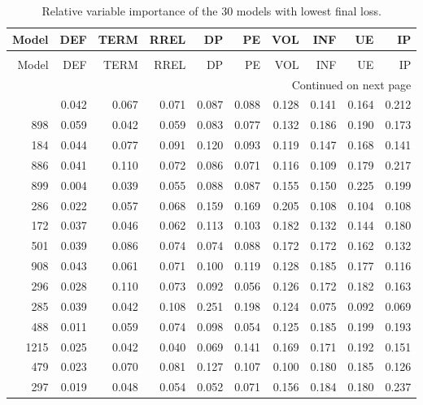 \begin{longtable}{rrrrrrrrrr}
\caption{Relative variable importance of the 30 models with lowest final loss.}
\label{tab:Importance_loss_FP_30}\\
\toprule
 Model &    DEF &  TERM &  RREL &    DP &    PE &   VOL &   INF &    UE &    IP \\
\midrule
\endfirsthead
\caption[]{Relative variable importance of the 30 models with lowest final loss.} \\
\toprule
 Model &    DEF &  TERM &  RREL &    DP &    PE &   VOL &   INF &    UE &    IP \\
\midrule
\endhead
\midrule
\multicolumn{10}{r}{{Continued on next page}} \\
\midrule
\endfoot

\bottomrule
\endlastfoot
   491 &  0.042 & 0.067 & 0.071 & 0.087 & 0.088 & 0.128 & 0.141 & 0.164 & 0.212 \\
   898 &  0.059 & 0.042 & 0.059 & 0.083 & 0.077 & 0.132 & 0.186 & 0.190 & 0.173 \\
   184 &  0.044 & 0.077 & 0.091 & 0.120 & 0.093 & 0.119 & 0.147 & 0.168 & 0.141 \\
   886 &  0.041 & 0.110 & 0.072 & 0.086 & 0.071 & 0.116 & 0.109 & 0.179 & 0.217 \\
   899 &  0.004 & 0.039 & 0.055 & 0.088 & 0.087 & 0.155 & 0.150 & 0.225 & 0.199 \\
   286 &  0.022 & 0.057 & 0.068 & 0.159 & 0.169 & 0.205 & 0.108 & 0.104 & 0.108 \\
   172 &  0.037 & 0.046 & 0.062 & 0.113 & 0.103 & 0.182 & 0.132 & 0.144 & 0.180 \\
   501 &  0.039 & 0.086 & 0.074 & 0.074 & 0.088 & 0.172 & 0.172 & 0.162 & 0.132 \\
   908 &  0.043 & 0.061 & 0.071 & 0.100 & 0.119 & 0.128 & 0.185 & 0.177 & 0.116 \\
   296 &  0.028 & 0.110 & 0.073 & 0.092 & 0.056 & 0.126 & 0.172 & 0.182 & 0.163 \\
   285 &  0.039 & 0.042 & 0.108 & 0.251 & 0.198 & 0.124 & 0.075 & 0.092 & 0.069 \\
   488 &  0.011 & 0.059 & 0.074 & 0.098 & 0.054 & 0.125 & 0.185 & 0.199 & 0.193 \\
  1215 &  0.025 & 0.042 & 0.040 & 0.069 & 0.141 & 0.169 & 0.171 & 0.192 & 0.151 \\
   479 &  0.023 & 0.070 & 0.081 & 0.127 & 0.107 & 0.100 & 0.180 & 0.185 & 0.126 \\
   297 &  0.019 & 0.048 & 0.054 & 0.052 & 0.071 & 0.156 & 0.184 & 0.180 & 0.237 \\

\end{longtable}
